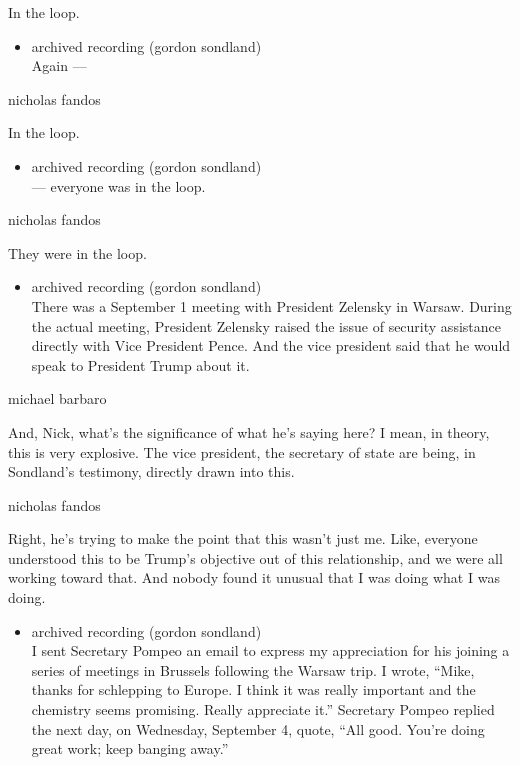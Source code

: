 In the loop.

\begin{itemize}
\tightlist
\item
  archived recording (gordon sondland)\\
  Again ---
\end{itemize}

nicholas fandos

In the loop.

\begin{itemize}
\tightlist
\item
  archived recording (gordon sondland)\\
  --- everyone was in the loop.
\end{itemize}

nicholas fandos

They were in the loop.

\begin{itemize}
\tightlist
\item
  archived recording (gordon sondland)\\
  There was a September 1 meeting with President Zelensky in Warsaw.
  During the actual meeting, President Zelensky raised the issue of
  security assistance directly with Vice President Pence. And the vice
  president said that he would speak to President Trump about it.
\end{itemize}

michael barbaro

And, Nick, what's the significance of what he's saying here? I mean, in
theory, this is very explosive. The vice president, the secretary of
state are being, in Sondland's testimony, directly drawn into this.

nicholas fandos

Right, he's trying to make the point that this wasn't just me. Like,
everyone understood this to be Trump's objective out of this
relationship, and we were all working toward that. And nobody found it
unusual that I was doing what I was doing.

\begin{itemize}
\tightlist
\item
  archived recording (gordon sondland)\\
  I sent Secretary Pompeo an email to express my appreciation for his
  joining a series of meetings in Brussels following the Warsaw trip. I
  wrote, ``Mike, thanks for schlepping to Europe. I think it was really
  important and the chemistry seems promising. Really appreciate it.''
  Secretary Pompeo replied the next day, on Wednesday, September 4,
  quote, ``All good. You're doing great work; keep banging away.''
\end{itemize}

